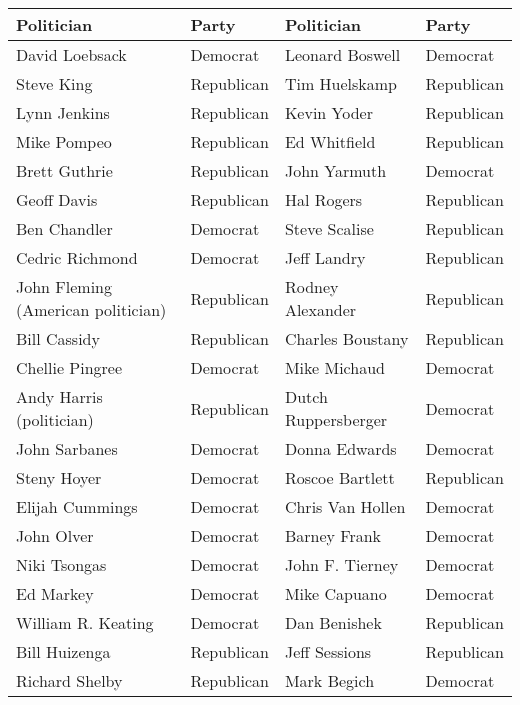 \documentclass[10pt,11pt,12pt,oneside]{book}
\begin{document}
\begin{appendices}
\begin{table}[H]
\begin{tabular}{|p{2in}|p{0.5in}||p{2in}|p{0.5in}|}
	\end{tabular}
\end{table}


\begin{table}[H]
	\tiny
	\begin{tabular}{|p{2in}|p{0.5in}||p{2in}|p{0.5in}|}
		\hline
		Politician & Party & Politician & Party\\ \hline
		David Loebsack & Democrat & Leonard Boswell & Democrat\\ \hline
		Steve King & Republican & Tim Huelskamp & Republican\\ \hline
		Lynn Jenkins & Republican & Kevin Yoder & Republican\\ \hline
		Mike Pompeo & Republican & Ed Whitfield & Republican\\ \hline
		Brett Guthrie & Republican & John Yarmuth & Democrat\\ \hline
		Geoff Davis & Republican & Hal Rogers & Republican\\ \hline
		Ben Chandler & Democrat & Steve Scalise & Republican\\ \hline
		Cedric Richmond & Democrat & Jeff Landry & Republican\\ \hline
		John Fleming (American politician) & Republican & Rodney Alexander & Republican\\ \hline
		Bill Cassidy & Republican & Charles Boustany & Republican\\ \hline
		Chellie Pingree & Democrat & Mike Michaud & Democrat\\ \hline
		Andy Harris (politician) & Republican & Dutch Ruppersberger & Democrat\\ \hline
		John Sarbanes & Democrat & Donna Edwards & Democrat\\ \hline
		Steny Hoyer & Democrat & Roscoe Bartlett & Republican\\ \hline
		Elijah Cummings & Democrat & Chris Van Hollen & Democrat\\ \hline
		John Olver & Democrat & Barney Frank & Democrat\\ \hline
		Niki Tsongas & Democrat & John F. Tierney & Democrat\\ \hline
		Ed Markey & Democrat & Mike Capuano & Democrat\\ \hline
		William R. Keating & Democrat & Dan Benishek & Republican\\ \hline
		Bill Huizenga & Republican & Jeff Sessions & Republican\\ \hline
		Richard Shelby & Republican & Mark Begich & Democrat\\ \hline

\end{tabular}
\end{table}
\end{appendices}
\end{document}
